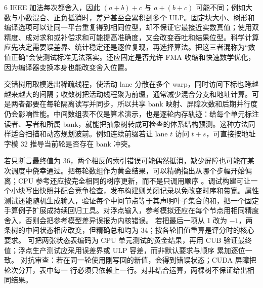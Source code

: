 \begin{solutionexercise}{6}
IEEE 加法每次都舍入，因此 $(a+b)+c$ 与 $a+(b+c)$ 可能不同；例如大数与小数混合、正负抵消时，差异甚至会累积到多个 ULP。固定块大小、树形和编译选项可以让同一平台重复得到相同位型，却不保证它最接近实数真值；使用双精度、成对求和或补偿求和可能提高准确度，又会改变吞吐和结果位型。科学计算应先决定需要误差界、统计稳定还是逐位复现，再选择算法。把这三者混称为“数值正确”会使测试标准无法落实。还应固定是否允许 FMA 收缩和快速数学优化，因为编译器变换本身也能改变舍入位置。

交错树用取模选出稀疏线程，使活动 lane 分散在多个 warp，同时访问下标也跨越越来越大的间隔；收敛树把活动线程聚为前缀，通常减少混合分支和地址计算。可是两者都要在每轮隔离读写并同步，所以共享 bank 映射、屏障次数和后期并行度仍会影响性能。中间数组表不仅是算术演示，也是逐轮内存轨迹：给每个单元标注读者、写者和所属 bank，就能把抽象树转成可检查的体系结构预测。这种方法同样适合扫描和动态规划波前。例如连续前缀若让 lane $t$ 访问 $t+s$，可直接按地址字模 32 推导当前轮是否存在 bank 冲突。

若只断言最终值为 36，两个相反的索引错误可能偶然抵消，缺少屏障也可能在某次调度中侥幸通过。把每轮数组作为黄金结果，可以精确指出从哪个步幅开始偏离；CPU 参考还应按完全相同的树序更新，而不是只调用顺序 。调试构建可让一个小块写出快照并配合竞争检查，发布构建则关闭记录以免改变时序和带宽。属性测试还能随机生成输入，验证每个中间节点等于其声明叶子集合的和，把一个固定手算例子扩展成持续回归工具。对浮点输入，参考模拟还应在每个节点用相同精度舍入，否则会把参考模型差异误报为内核错误。
\variantheading 若把最后一项从 1 改为 $-1$，两条树的中间状态相应改变，但精确总和均为
$34$；按各轮旧值重算是评分时的核心要求。
\practiceheading 可把两张状态表编码为 CPU 单元测试的黄金结果，再用 CUB
 验证最终值；浮点生产测试应采用误差界或 ULP 容差，而非默认要求与顺序
累加逐位一致。
对抗审查：若在同一轮使用刚写回的新值，会得到错误状态；CUDA 屏障把轮次分开，表中每一
行必须只依赖上一行。对非结合运算，两棵树不保证给出相同结果。
\end{solutionexercise}

